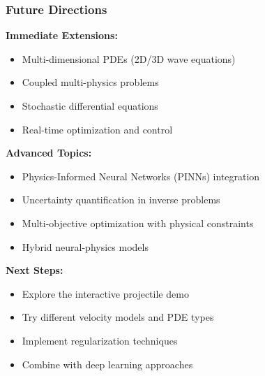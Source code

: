 \documentclass[notes]{beamer}
\begin{document}
\begin{frame}
\frametitle{Future Directions}

\textbf{Immediate Extensions:}
\begin{itemize}
    \item Multi-dimensional PDEs (2D/3D wave equations)
    \item Coupled multi-physics problems
    \item Stochastic differential equations
    \item Real-time optimization and control
\end{itemize}

\vspace{1cm}

\textbf{Advanced Topics:}
\begin{itemize}
    \item Physics-Informed Neural Networks (PINNs) integration
    \item Uncertainty quantification in inverse problems
    \item Multi-objective optimization with physical constraints
    \item Hybrid neural-physics models
\end{itemize}

\vspace{1cm}

\textbf{Next Steps:}
\begin{itemize}
    \item Explore the interactive projectile demo
    \item Try different velocity models and PDE types
    \item Implement regularization techniques
    \item Combine with deep learning approaches
\end{itemize}

\end{frame}
\end{document}
